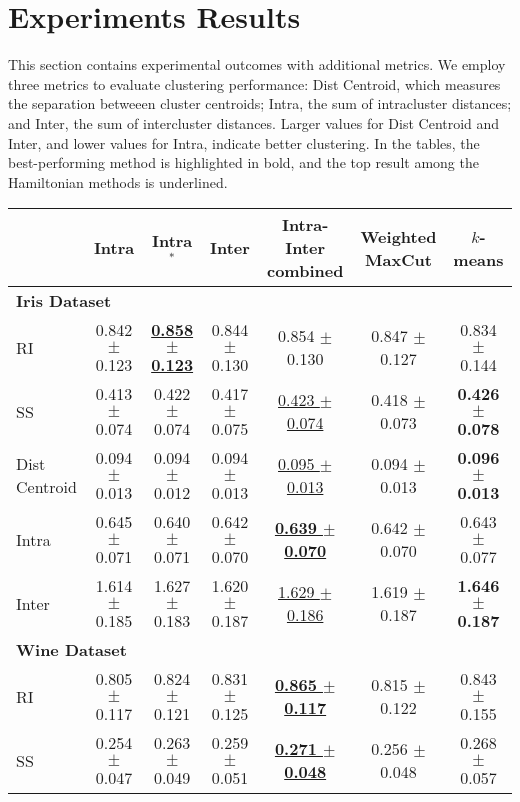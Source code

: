 \documentclass[showpacs,twocolumn,superscriptaddress]{revtex4-2}
\begin{document}
\section{Experiments Results}
\label{sec:Appendix_B}
This section contains experimental outcomes with additional metrics. We employ three metrics to evaluate clustering performance: Dist Centroid, which measures the separation betweeen cluster centroids; Intra, the sum of intracluster distances; and Inter, the sum of intercluster distances. Larger values for Dist Centroid and Inter, and lower values for Intra, indicate better clustering. In the tables, the best-performing method is highlighted in bold, and the top result among the Hamiltonian methods is underlined.

\begin{table*}[!ht]
    \centering
    \fontsize{9}{11}\selectfont
    \begin{tabular}{lcccccc}
    \toprule
      & Intra & Intra$^*$ & Inter & Intra-Inter combined & Weighted MaxCut & $k$-means \\
    \midrule
    \multicolumn{7}{l}{\textbf{Iris Dataset}} \\
    RI & 0.842 $\pm$ 0.123 & \underline{\textbf{0.858 $\pm$ 0.123}} & 0.844 $\pm$ 0.130 & 0.854 $\pm$ 0.130 & 0.847 $\pm$ 0.127 & 0.834 $\pm$ 0.144 \\
    SS & 0.413 $\pm$ 0.074 & 0.422 $\pm$ 0.074 & 0.417 $\pm$ 0.075 & \underline{0.423 $\pm$ 0.074} & 0.418 $\pm$ 0.073 & \textbf{0.426 $\pm$ 0.078} \\
    Dist Centroid & 0.094 $\pm$ 0.013 & 0.094 $\pm$ 0.012 & 0.094 $\pm$ 0.013 & \underline{0.095 $\pm$ 0.013} & 0.094 $\pm$ 0.013 & \textbf{0.096 $\pm$ 0.013} \\
    Intra & 0.645 $\pm$ 0.071 & 0.640 $\pm$ 0.071 & 0.642 $\pm$ 0.070 & \underline{\textbf{0.639 $\pm$ 0.070}} & 0.642 $\pm$ 0.070 & 0.643 $\pm$ 0.077 \\
    Inter & 1.614 $\pm$ 0.185 & 1.627 $\pm$ 0.183 & 1.620 $\pm$ 0.187 & \underline{1.629 $\pm$ 0.186} & 1.619 $\pm$ 0.187 & \textbf{1.646 $\pm$ 0.187} \\
    \midrule
    \multicolumn{7}{l}{\textbf{Wine Dataset}} \\
    RI & 0.805 $\pm$ 0.117 & 0.824 $\pm$ 0.121 & 0.831 $\pm$ 0.125 & \underline{\textbf{0.865 $\pm$ 0.117}} & 0.815 $\pm$ 0.122 & 0.843 $\pm$ 0.155 \\
    SS & 0.254 $\pm$ 0.047 & 0.263 $\pm$ 0.049 & 0.259 $\pm$ 0.051 & \underline{\textbf{0.271 $\pm$ 0.048}} & 0.256 $\pm$ 0.048 & 0.268 $\pm$ 0.057 \\

\end{tabular}
\end{table*}
\end{document}
